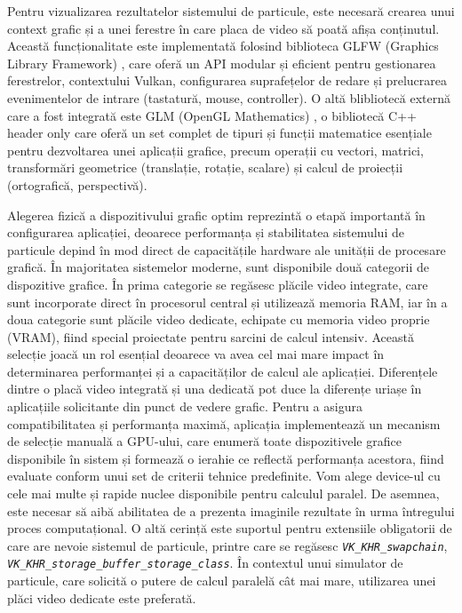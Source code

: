 Pentru vizualizarea rezultatelor sistemului de particule, este necesară crearea unui context grafic și a unei ferestre în care placa de video să poată afișa conținutul. Această funcționalitate este implementată folosind biblioteca GLFW (Graphics Library Framework) \cite{GLFW_citation}, care oferă un API modular și eficient pentru gestionarea ferestrelor, contextului Vulkan, configurarea suprafețelor de redare și prelucrarea evenimentelor de intrare (tastatură, mouse, controller). O altă blibliotecă externă care a fost integrată este GLM (OpenGL Mathematics) \cite{GLM_citation}, o bibliotecă C++ header only care oferă un set complet de tipuri și funcții matematice esențiale pentru dezvoltarea unei aplicații grafice, precum operații cu vectori, matrici, transformări geometrice (translație, rotație, scalare) și calcul de proiecții (ortografică, perspectivă). 

Alegerea fizică a dispozitivului grafic optim reprezintă o etapă importantă în configurarea aplicației, deoarece performanța și stabilitatea sistemului de particule depind în mod direct de capacitățile hardware ale unității de procesare grafică. În majoritatea sistemelor moderne, sunt disponibile două categorii de dispozitive grafice. În prima categorie se regăsesc plăcile video integrate, care sunt incorporate direct în procesorul central și utilizează memoria RAM, iar în a doua categorie sunt plăcile video dedicate, echipate cu memoria video proprie (VRAM), fiind special proiectate pentru sarcini de calcul intensiv. Această selecție joacă un rol esențial deoarece va avea cel mai mare impact în determinarea performanței și a capacităților de calcul ale aplicației. Diferențele dintre o placă video integrată și una dedicată pot duce la diferențe uriașe în aplicațiile solicitante din punct de vedere grafic. Pentru a asigura compatibilitatea și performanța maximă, aplicația implementează un mecanism de selecție manuală a GPU-ului, care enumeră toate dispozitivele grafice disponibile în sistem și formează o ierahie ce reflectă performanța acestora, fiind evaluate conform unui set de criterii tehnice predefinite. Vom alege device-ul cu cele mai multe și rapide nuclee disponibile pentru calculul paralel. De asemnea, este necesar să aibă abilitatea de a prezenta imaginile rezultate în urma întregului proces computațional. O altă cerință este suportul pentru extensiile obligatorii de care are nevoie sistemul de particule, printre care se regăsesc \textit{\texttt{VK\_KHR\_swapchain}}, \textit{\texttt{VK\_KHR\_storage\_buffer\_storage\_class}}. În contextul unui simulator de particule, care solicită o putere de calcul paralelă cât mai mare, utilizarea unei plăci video dedicate este preferată. 

